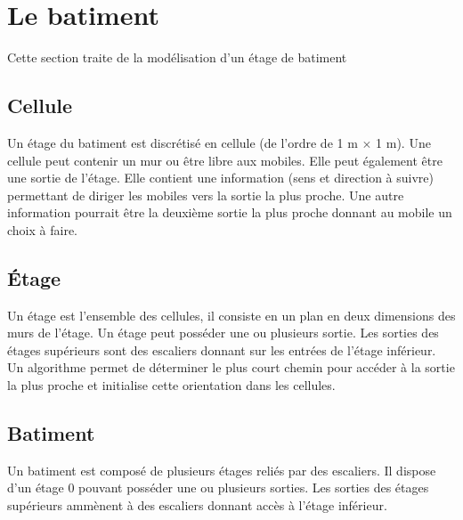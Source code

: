 %
\section{Le batiment}
%
Cette section traite de la modélisation d'un étage de batiment
%
\subsection{Cellule}
Un étage du batiment est discrétisé en cellule (de l'ordre de 1 m $\times$ 1 m). Une cellule peut contenir un mur ou être libre aux mobiles. Elle peut également être une sortie de l'étage. Elle contient une information (sens et direction à suivre) permettant de diriger les mobiles vers la sortie la plus proche. Une autre information pourrait être la deuxième sortie la plus proche donnant au mobile un choix à faire.
%
%
\subsection{Étage}
Un étage est l'ensemble des cellules, il consiste en un plan en deux dimensions des murs de l'étage. Un étage peut posséder une ou plusieurs sortie. Les sorties des étages supérieurs sont des escaliers donnant sur les entrées de l'étage inférieur. Un algorithme permet de déterminer le plus court chemin pour accéder à la sortie la plus proche et initialise cette orientation dans les cellules.
%
%
\subsection{Batiment}
Un batiment est composé de plusieurs étages reliés par des escaliers. Il dispose d'un étage 0 pouvant posséder une ou plusieurs sorties. Les sorties des étages supérieurs ammènent à des escaliers donnant accès à l'étage inférieur.

